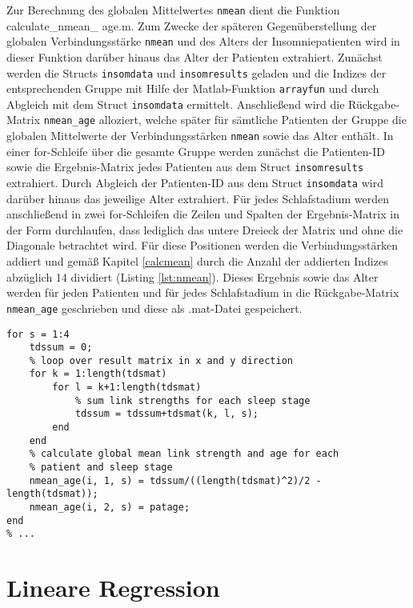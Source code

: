 Zur Berechnung des globalen Mittelwertes \texttt{nmean} dient die Funktion calculate\_nmean\_ age.m. Zum Zwecke der späteren Gegenüberstellung der globalen Verbindungsstärke \texttt{nmean} und des Alters der Insomniepatienten wird in dieser Funktion darüber hinaus das Alter der Patienten extrahiert. Zunächst werden die Structs \texttt{insomdata} und \texttt{insomresults} geladen und die Indizes der entsprechenden Gruppe mit Hilfe der Matlab-Funktion \texttt{arrayfun} und durch Abgleich mit dem Struct \texttt{insomdata} ermittelt. Anschließend wird die Rückgabe-Matrix \texttt{nmean\_age} alloziert, welche später für sämtliche Patienten der Gruppe die globalen Mittelwerte der Verbindungsstärken \texttt{nmean} sowie das Alter enthält. In einer for-Schleife über die gesamte Gruppe werden zunächst die Patienten-ID sowie die Ergebnis-Matrix jedes Patienten aus dem Struct \texttt{insomresults} extrahiert. Durch Abgleich der Patienten-ID aus dem Struct \texttt{insomdata} wird darüber hinaus das jeweilige Alter extrahiert. Für jedes Schlafstadium werden anschließend in zwei for-Schleifen die Zeilen und Spalten der Ergebnis-Matrix in der Form durchlaufen, dass lediglich das untere Dreieck der Matrix und ohne die Diagonale betrachtet wird. Für diese Positionen werden die Verbindungsstärken addiert und gemäß Kapitel \ref{calcmean} durch die Anzahl der addierten Indizes abzüglich 14 dividiert (Listing \ref{lst:nmean}). Dieses Ergebnis sowie das Alter werden für jeden Patienten und für jedes Schlafstadium in die Rückgabe-Matrix \texttt{nmean\_age} geschrieben und diese als .mat-Datei gespeichert.\\

\begin{lstlisting}[caption={Berechnung des globalen Mittelwertes in der Funktion calculate\_nmean\_age.m}, label={lst:nmean}]
% ...
for s = 1:4
    tdssum = 0;
    % loop over result matrix in x and y direction
    for k = 1:length(tdsmat)
        for l = k+1:length(tdsmat)
            % sum link strengths for each sleep stage
            tdssum = tdssum+tdsmat(k, l, s);
        end
    end
    % calculate global mean link strength and age for each
    % patient and sleep stage
    nmean_age(i, 1, s) = tdssum/((length(tdsmat)^2)/2 - length(tdsmat));
    nmean_age(i, 2, s) = patage;
end
% ...
\end{lstlisting}

\section{Lineare Regression}

